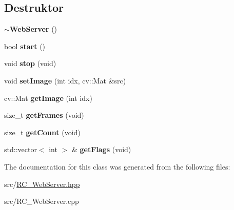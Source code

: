 \subsection*{Destruktor}
\begin{DoxyCompactItemize}
\item 
\hypertarget{classrc_1_1WebServer_a6b3b77c3c9bcc9668d558cbe71b57c15}{{\bfseries $\sim$\+Web\+Server} ()}\label{classrc_1_1WebServer_a6b3b77c3c9bcc9668d558cbe71b57c15}

\item 
\hypertarget{classrc_1_1WebServer_a44df359fc4f9e5e3209bf5cfcbb22980}{bool {\bfseries start} ()}\label{classrc_1_1WebServer_a44df359fc4f9e5e3209bf5cfcbb22980}

\item 
\hypertarget{classrc_1_1WebServer_a06ae92d6dadbbfdc4289c31fbfab6624}{void {\bfseries stop} (void)}\label{classrc_1_1WebServer_a06ae92d6dadbbfdc4289c31fbfab6624}

\item 
\hypertarget{classrc_1_1WebServer_af66eaf683e6e29c3f5c0530025aef5f7}{void {\bfseries set\+Image} (int idx, cv\+::\+Mat \&src)}\label{classrc_1_1WebServer_af66eaf683e6e29c3f5c0530025aef5f7}

\item 
\hypertarget{classrc_1_1WebServer_afa3effc52a15f4bef40da8209502ac72}{cv\+::\+Mat {\bfseries get\+Image} (int idx)}\label{classrc_1_1WebServer_afa3effc52a15f4bef40da8209502ac72}

\item 
\hypertarget{classrc_1_1WebServer_a1f8551f408b09eb67a49d050f253ed1f}{size\+\_\+t {\bfseries get\+Frames} (void)}\label{classrc_1_1WebServer_a1f8551f408b09eb67a49d050f253ed1f}

\item 
\hypertarget{classrc_1_1WebServer_ab0807008779f05091bab37f158b65b34}{size\+\_\+t {\bfseries get\+Count} (void)}\label{classrc_1_1WebServer_ab0807008779f05091bab37f158b65b34}

\item 
\hypertarget{classrc_1_1WebServer_a877ed11cc160de9b56851dafe396d25a}{std\+::vector$<$ int $>$ \& {\bfseries get\+Flags} (void)}\label{classrc_1_1WebServer_a877ed11cc160de9b56851dafe396d25a}

\end{DoxyCompactItemize}


The documentation for this class was generated from the following files\+:\begin{DoxyCompactItemize}
\item 
src/\hyperlink{RC__WebServer_8hpp}{R\+C\+\_\+\+Web\+Server.\+hpp}\item 
src/R\+C\+\_\+\+Web\+Server.\+cpp\end{DoxyCompactItemize}
